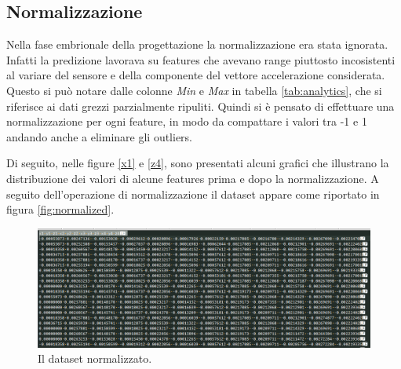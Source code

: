 \documentclass[12pt]{article}
\begin{document}
\subsection{Normalizzazione}
Nella fase embrionale della progettazione la normalizzazione era stata ignorata. Infatti la predizione lavorava su features che avevano range piuttosto incosistenti al variare del sensore e della componente del vettore accelerazione considerata. Questo si può notare dalle colonne \textit{Min} e \textit{Max} in tabella \ref{tab:analytics}, che si riferisce ai dati grezzi parzialmente ripuliti. Quindi si è pensato di effettuare una normalizzazione per ogni feature, in modo da compattare i valori tra -1 e 1 andando anche a eliminare gli outliers. \par
Di seguito, nelle figure \ref{x1} e \ref{z4}, sono presentati alcuni grafici che illustrano la distribuzione dei valori di alcune features prima e dopo la normalizzazione. A seguito dell'operazione di normalizzazione il dataset appare come riportato in figura \ref{fig:normalized}.

\begin{figure}[H]
	\includegraphics[width=1\textwidth]{images/datasetNormalizzato.PNG}
	\caption{Il dataset normalizzato.}
	\label{normalized}
\end{figure}
\end{document}
